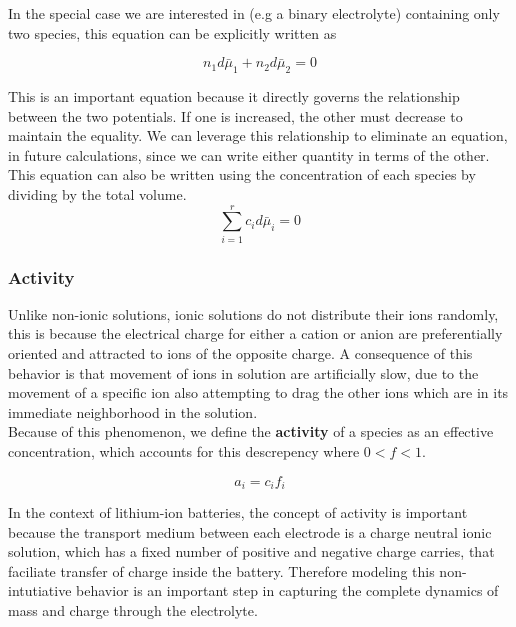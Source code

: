 \documentclass[lettersize,journal]{IEEEtran}
\begin{document}
In the special case we are interested in (e.g a binary electrolyte) containing only two species, this equation can be explicitly written as

\begin{equation}\label{gibbs_duhem_eqn}
  n_1 d\bar{\mu}_1 + n_2 d\bar{\mu}_2 = 0
\end{equation}

This is an important equation because it directly governs the relationship between the two potentials. If one is increased, the other must decrease to maintain the equality. We can leverage this relationship to eliminate an equation, in future calculations, since we can write either quantity in terms of the other. This equation can also be written using the concentration of each species by dividing by the total volume.
\begin{equation}
  \sum_{i=1}^{r} c_{i}d\bar{\mu}_i = 0
\end{equation}

\subsubsection{Activity}

Unlike non-ionic solutions, ionic solutions do not distribute their ions randomly, this is because the electrical charge for either a cation or anion are preferentially oriented and attracted to ions of the opposite charge. A consequence of this behavior is that movement of ions in solution are artificially slow, due to the movement of a specific ion also attempting to drag the other ions which are in its immediate neighborhood in the solution. \\

Because of this phenomenon, we define the \textbf{activity} of a species as an effective concentration, which accounts for this descrepency where $0< f <1$.

\begin{equation}\label{activity}
  a_i = c_i f_i
\end{equation}

In the context of lithium-ion batteries, the concept of activity is important because the transport medium between each electrode is a charge neutral ionic solution, which has a fixed number of positive and negative charge carries, that faciliate transfer of charge inside the battery. Therefore modeling this non-intutiative behavior is an important step in capturing the complete dynamics of mass and charge through the electrolyte. \\
\end{document}

